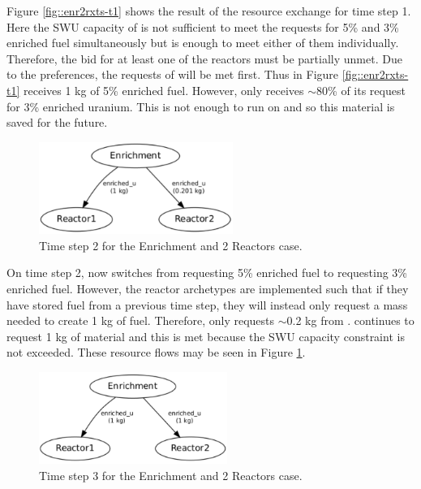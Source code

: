 Figure \ref{fig::enr2rxts-t1} shows the result of the resource exchange for time
step 1.  Here the SWU capacity of \Enrichment{} is not sufficient to meet the
requests for 5\% and 3\% enriched fuel simultaneously but is enough to meet
either of them individually.  Therefore, the bid for at least one of the
reactors must be partially unmet.  Due to the preferences, the requests
of  will be met first.  Thus in
Figure \ref{fig::enr2rxts-t1}  receives 1 kg of 5\% enriched fuel.
However,  only receives $\sim$80\% of its request for 3\% enriched
uranium.  This is not enough to run on and so this material is saved for the
future.

\begin{figure}
  \begin{center}
    \includegraphics[height=3cm]{./figs/1_Enrichment_2_Reactor-t2.pdf}
    \caption[]{\label{fig::enr2rxts-t2}Time step 2 for the Enrichment and 2 Reactors 
        case.}
  \end{center}
\end{figure}

On time step 2,  now switches from requesting 5\% enriched fuel to
requesting 3\% enriched fuel.  However, the reactor archetypes are implemented
such that if they have stored fuel from a previous time step, they will instead
only request a mass needed to create 1 kg of fuel.  Therefore,  only
requests $\sim$0.2 kg from \Enrichment{}.   continues to request 1 kg
of material and this is met because the SWU capacity constraint is not exceeded.
These resource flows may be seen in Figure \ref{fig::enr2rxts-t2}.

\begin{figure}
  \begin{center}
    \includegraphics[height=3cm]{./figs/1_Enrichment_2_Reactor-t3.pdf}
    \caption[]{\label{fig::enr2rxts-t3}Time step 3 for the Enrichment and 2 Reactors 
        case.}
  \end{center}
\end{figure}

